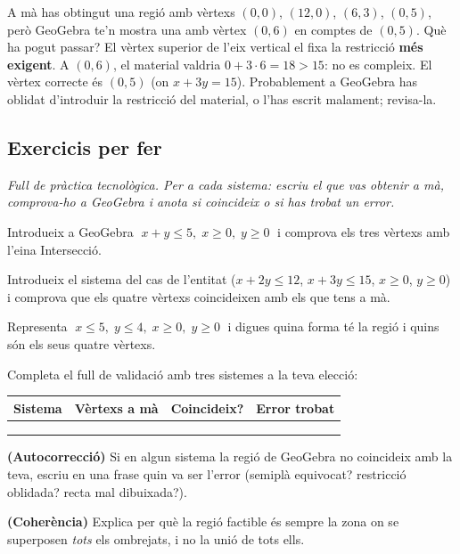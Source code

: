 \begin{exresolt}
A mà has obtingut una regió amb vèrtexs $(0,0)$, $(12,0)$, $(6,3)$, $(0,5)$, però
GeoGebra te'n mostra una amb vèrtex $(0,6)$ en comptes de $(0,5)$. Què ha pogut
passar?
\solucio
El vèrtex superior de l'eix vertical el fixa la restricció \textbf{més exigent}. A
$(0,6)$, el material valdria $0+3\cdot 6=18>15$: no es compleix. El vèrtex correcte
és $(0,5)$ (on $x+3y=15$). Probablement a GeoGebra has oblidat d'introduir la
restricció del material, o l'has escrit malament; revisa-la.
\end{exresolt}

\subsection{Exercicis per fer}

\noindent\textit{Full de pràctica tecnològica. Per a cada sistema: escriu el que vas
obtenir a mà, comprova-ho a GeoGebra i anota si coincideix o si has trobat un error.}

\begin{exercicis}
\begin{exlist}
  \item Introdueix a GeoGebra $\;x+y\le 5,\;x\ge 0,\;y\ge 0\;$ i comprova els tres
        vèrtexs amb l'eina Intersecció.
  \item Introdueix el sistema del cas de l'entitat ($x+2y\le 12$, $x+3y\le 15$,
        $x\ge 0$, $y\ge 0$) i comprova que els quatre vèrtexs coincideixen amb els que
        tens a mà.
  \item Representa $\;x\le 5,\;y\le 4,\;x\ge 0,\;y\ge 0\;$ i digues quina forma té la
        regió i quins són els seus quatre vèrtexs.
  \item Completa el full de validació amb tres sistemes a la teva elecció:
        \begin{center}
        \renewcommand{\arraystretch}{1.4}
        \begin{tabular}{p{3.6cm} p{3.4cm} p{2cm} p{2.6cm}}
        \toprule
        \textbf{Sistema} & \textbf{Vèrtexs a mà} & \textbf{Coincideix?} & \textbf{Error trobat} \\
        \midrule
         & & & \\[10pt]
         & & & \\[10pt]
         & & & \\
        \bottomrule
        \end{tabular}
        \end{center}
  \item \textbf{(Autocorrecció)} Si en algun sistema la regió de GeoGebra no coincideix
        amb la teva, escriu en una frase quin va ser l'error (semiplà equivocat?
        restricció oblidada? recta mal dibuixada?).
  \item \textbf{(Coherència)} Explica per què la regió factible és sempre la zona on se
        superposen \emph{tots} els ombrejats, i no la unió de tots ells.
\end{exlist}
\end{exercicis}

